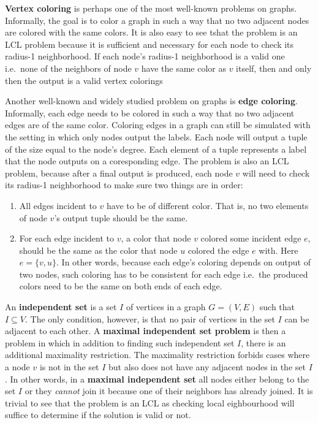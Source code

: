 \textbf{Vertex coloring} is perhaps one of the most well-known
problems on graphs. Informally, the goal is to color a graph
in such a way that no two adjacent nodes are colored with the
same colors. It is also easy to see tshat the problem is an
LCL problem because it is sufficient and necessary for each node to check
its radius-1 neighborhood. If each node's radius-1 neighborhood is
a valid one i.e.\ none of the neighbors of node $v$ have the same color as $v$
itself, then and only then the output is a valid vertex colorings

Another well-known and widely studied problem on graphs is
\textbf{edge coloring}. Informally, each edge needs to be
colored in such a way that no two adjacent edges are of the same
color. Coloring edges in a graph can still be simulated
with the setting in which only nodes output the labels.
Each node will output a tuple of the size equal to the node's
degree. Each element of a tuple represents a label
that the node outputs on a coresponding edge. The problem
is also an LCL problem, because after a final output is
produced, each node $v$ will need to check its radius-1
neighborhood to make sure two things are in order:
\begin{enumerate}
  \item All edges incident to $v$ have to be of different color.
That is, no two elements of node $v$'s output tuple should be the same.

  \item For each edge incident to $v$, a color that node $v$ colored some incident
edge $e$, should be the same as the color that node $u$ colored the edge $e$ with.
Here $e = \{v, u\}$. In other words, because each edge's coloring depends on
output of two nodes, such coloring has to be consistent for each edge i.e.\ the produced
colors need to be the same on both ends of each edge.
\end{enumerate}

An \textbf{independent set} is a set $I$ of vertices in a graph $G = (V, E)$ such that
$I \subseteq V$. The only condition, however, is that no pair of vertices in the set $I$
can be adjacent to each other. A \textbf{maximal independent set problem} is then a
problem in which in addition to finding such independent set $I$, there is an additional
maximality restriction. The maximality restriction forbids cases where a node $v$
is not in the set $I$ but also does not have any adjacent nodes in the set $I$.
In other words, in a \textbf{maximal independent set} all nodes either belong
to the set $I$ or they \emph{cannot} join it because one of their neighbors has
already joined. It is trivial to see that the problem is an LCL as checking local
eighbourhood will suffice to determine if the solution is valid or not.

